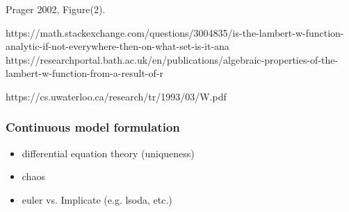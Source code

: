 \documentclass[12pt]{article}
\begin{document}
%
Prager 2002, Figure(2).



https://math.stackexchange.com/questions/3004835/is-the-lambert-w-function-analytic-if-not-everywhere-then-on-what-set-is-it-ana
https://researchportal.bath.ac.uk/en/publications/algebraic-properties-of-the-lambert-w-function-from-a-result-of-r

%
https://cs.uwaterloo.ca/research/tr/1993/03/W.pdf

%




%
\subsubsection{Continuous model formulation}
	\begin{itemize}
		\item differential equation theory (uniqueness)
		\item chaos
		\item euler vs. Implicate (e.g. lsoda, etc.)		
	\end{itemize}
\end{document}
